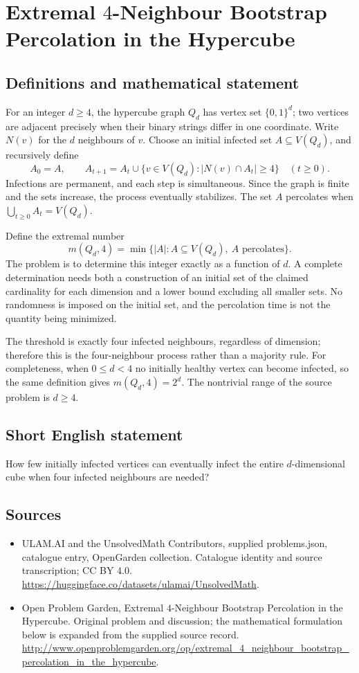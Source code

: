\documentclass[11pt,a4paper]{article}
\begin{document}
\section*{Extremal $4$-Neighbour Bootstrap Percolation in the Hypercube}\label{statement}

\subsection{Definitions and mathematical statement}
For an integer $d\ge4$, the hypercube graph $Q_d$ has vertex set
$\{0,1\}^d$; two vertices are adjacent precisely when their binary strings
differ in one coordinate. Write $N(v)$ for the $d$ neighbours of $v$.
Choose an initial infected set $A\subseteq V(Q_d)$, and recursively define
\[
 A_0=A,\qquad
 A_{t+1}=A_t\cup\{v\in V(Q_d):|N(v)\cap A_t|\ge4\}
 \quad(t\ge0).
\]
Infections are permanent, and each step is simultaneous. Since the graph
is finite and the sets increase, the process eventually stabilizes.
The set $A$ percolates when $\bigcup_{t\ge0}A_t=V(Q_d)$.

Define the extremal number
\[
 m(Q_d,4)=\min\{|A|:A\subseteq V(Q_d),\ A\text{ percolates}\}.
\]
The problem is to determine this integer exactly as a function of $d$.
A complete determination needs both a construction of an initial set of
the claimed cardinality for each dimension and a lower bound excluding
all smaller sets. No randomness is imposed on the initial set, and the
percolation time is not the quantity being minimized.

The threshold is exactly four infected neighbours, regardless of dimension;
therefore this is the four-neighbour process rather than a majority rule.
For completeness, when $0\le d<4$ no initially healthy vertex can become
infected, so the same definition gives $m(Q_d,4)=2^d$. The nontrivial range
of the source problem is $d\ge4$.
\subsection{Short English statement}
How few initially infected vertices can eventually infect the entire $d$-dimensional cube when four infected neighbours are needed?
\subsection{Sources}
\begin{itemize}
\item[S1] ULAM.AI and the UnsolvedMath Contributors, supplied problems.json, catalogue entry, OpenGarden collection. Catalogue identity and source transcription; CC BY 4.0.
\url{https://huggingface.co/datasets/ulamai/UnsolvedMath}.
\item[S2] Open Problem Garden, Extremal $4$-Neighbour Bootstrap Percolation in the Hypercube. Original problem and discussion; the mathematical formulation below is expanded from the supplied source record.
\url{http://www.openproblemgarden.org/op/extremal_4_neighbour_bootstrap_percolation_in_the_hypercube}.
\end{itemize}
\end{document}
